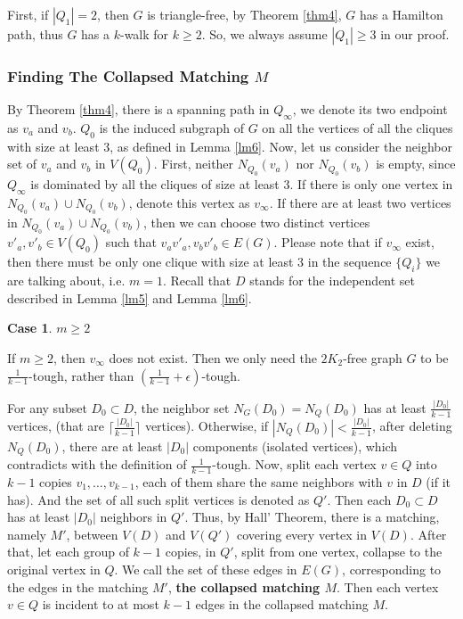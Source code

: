 \documentclass[12pt]{article}
\newtheorem{case}{Case}
\begin{document}
First, if $|Q_1|=2$, then $G$ is triangle-free, by Theorem \ref{thm4}, $G$ has a Hamilton path, thus $G$ has a $k$-walk for $k\ge2$. So, we always assume $|Q_1|\ge3$ in our proof.

\subsubsection{Finding The Collapsed Matching $M$}
By Theorem \ref{thm4}, there is a spanning path in $Q_{\infty}$, we denote its two endpoint as $v_a$ and $v_b$. $Q_0$ is the induced subgraph of $G$ on all the vertices of all the cliques with size at least 3, as defined in Lemma \ref{lm6}. Now, let us consider the neighbor set of $v_a$ and $v_b$ in $V(Q_0)$. First, neither $N_{Q_0}(v_a)$ nor $N_{Q_0}(v_b)$ is empty, since $Q_{\infty}$ is dominated by all the cliques of size at least 3. If there is only one vertex in $N_{Q_0}(v_a)\cup N_{Q_0}(v_b)$, denote this vertex as $v_{\infty}$. If there are at least two vertices in $N_{Q_0}(v_a)\cup N_{Q_0}(v_b)$, then we can choose two distinct vertices $v'_a,v'_b\in V(Q_0)$ such that $v_av'_a,v_bv'_b\in E(G)$. Please note that if $v_{\infty}$ exist, then there must be only one clique with size at least 3 in the sequence $\{Q_i\}$ we are talking about, i.e. $m=1$.
Recall that $D$ stands for the independent set described in Lemma \ref{lm5} and Lemma \ref{lm6}. 

\begin{case}$m\ge2$\end{case}
If $m\ge2$, then $v_{\infty}$ does not exist. Then we only need the $2K_2$-free graph $G$ to be $\frac{1}{k-1}$-tough, rather than $(\frac{1}{k-1}+\epsilon)$-tough.

For any subset $D_0\subset D$, the neighbor set $N_{G}(D_0)=N_Q(D_0)$ has at least $\frac{|D_0|}{k-1}$ vertices, (that are $\lceil\frac{|D_0|}{k-1}\rceil$ vertices). Otherwise, if $|N_Q(D_0)|<\frac{|D_0|}{k-1}$, after deleting $N_Q(D_0)$, there are at least $|D_0|$ components (isolated vertices), which contradicts with the definition of $\frac{1}{k-1}$-tough. 
Now, split each vertex $v\in Q$ into $k-1$ copies $v_1,\ldots,v_{k-1}$, each of them share the same neighbors with $v$ in $D$ (if it has). And the set of all such split vertices is denoted as $Q'$.  Then each $D_0\subset D$ has at least $|D_0|$ neighbors in $Q'$.
Thus, by Hall' Theorem, there is a matching, namely $M'$, between $V(D)$ and $V(Q')$ covering every vertex in $V(D)$. 
After that, let each group of $k-1$ copies, in $Q'$, split from one vertex, collapse to the original vertex in $Q$. We call the set of these edges in $E(G)$, corresponding to the edges in the matching $M'$, {\bf the collapsed matching $M$}. Then each vertex $v\in Q$ is incident to at most $k-1$ edges in the collapsed matching $M$. 
\end{document}

